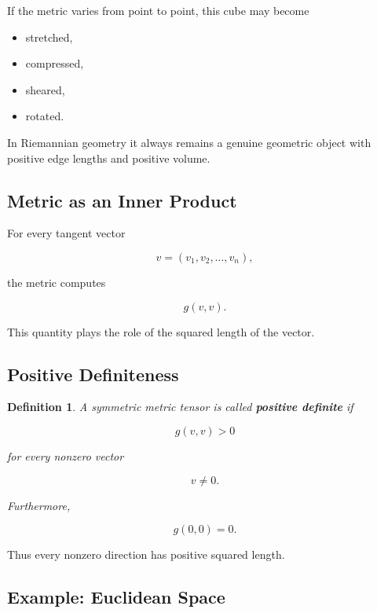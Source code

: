 \documentclass[12pt,a4paper]{article}
\theoremstyle{notespace}
\newtheorem{definition}{Definition}[subsection]
\begin{document}
If the metric varies from point to point, this cube may become

\begin{itemize}
	\item stretched,
	\item compressed,
	\item sheared,
	\item rotated.
\end{itemize}

In Riemannian geometry it always remains a genuine geometric object
with positive edge lengths and positive volume.


\subsection{Metric as an Inner Product}

For every tangent vector

\[
v=(v_1,v_2,\ldots,v_n),
\]

the metric computes

\[
g(v,v).
\]

This quantity plays the role of the squared length of the vector.


\subsection{Positive Definiteness}

\begin{definition}
	A symmetric metric tensor is called \textbf{positive definite} if
	
	\[
	g(v,v)>0
	\]
	
	for every nonzero vector
	
	\[
	v\neq0.
	\]
	
	Furthermore,
	
	\[
	g(0,0)=0.
	\]
\end{definition}

Thus every nonzero direction has positive squared length.


\subsection{Example: Euclidean Space}
\end{document}
